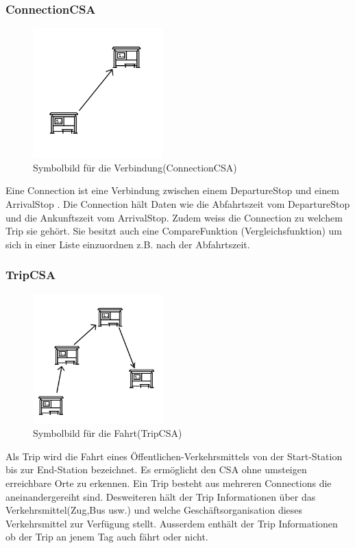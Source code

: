 \subsubsection{ConnectionCSA}
\begin{figure}[htb]
	\centering
	\includegraphics[width=5cm]{img/connection.png}
	\caption{Symbolbild für die Verbindung(ConnectionCSA)}
	\label{fig:connection}
\end{figure}
Eine Connection ist eine Verbindung zwischen einem DepartureStop und einem ArrivalStop . Die Connection hält Daten wie die Abfahrtszeit vom DepartureStop und die Ankunftszeit vom ArrivalStop. Zudem weiss die Connection zu welchem Trip sie gehört. Sie besitzt auch eine CompareFunktion (Vergleichsfunktion) um sich in einer Liste einzuordnen z.B. nach der Abfahrtszeit.

\subsubsection{TripCSA}
\begin{figure}[htb]
	\centering
	\includegraphics[width=5cm]{img/trip.png}
	\caption{Symbolbild für die Fahrt(TripCSA)}
	\label{fig:trip}
\end{figure}
Als Trip wird die Fahrt eines Öffentlichen-Verkehrsmittels von der Start-Station bis zur End-Station bezeichnet. Es ermöglicht den CSA ohne umsteigen erreichbare Orte zu erkennen. Ein Trip besteht aus mehreren Connections die aneinandergereiht sind. Desweiteren hält der Trip Informationen über das Verkehrsmittel(Zug,Bus usw.) und welche Geschäftsorganisation dieses Verkehrsmittel zur Verfügung stellt. Ausserdem enthält der Trip Informationen ob der Trip an jenem Tag auch fährt oder nicht.

